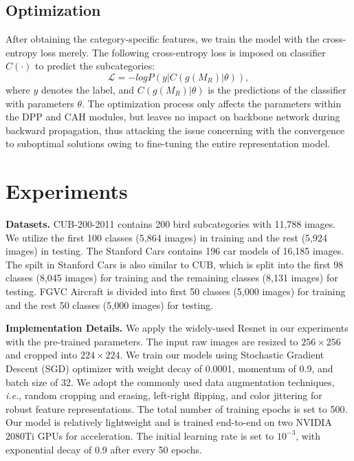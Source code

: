 \documentclass[letterpaper]{article} %
\begin{document}
\subsection{Optimization}

After obtaining the category-specific features, we train the model with the cross-entropy loss merely. The following cross-entropy loss is imposed on classifier $ C(\cdot) $ to predict the subcategories:
\begin{equation}
\mathcal{L} = - log P(y|C(g(M_R)|\theta)),
\end{equation} 
where $ y $ denotes the label, and $ C(g(M_R)|\theta) $ is the predictions of the classifier with parameters $ \theta $. The optimization process only affects the parameters within the DPP and CAH modules, but leaves no impact on backbone network during backward propagation, thus attacking the issue concerning with the convergence to suboptimal solutions owing to fine-tuning the entire representation model.



\section{Experiments}
\noindent\textbf{Datasets.} CUB-200-2011 \cite{Branson2014Bird} contains 200 bird subcategories with 11,788 images. We utilize the first 100 classes (5,864 images) in training and the rest (5,924 images) in testing. The Stanford Cars \cite{Krause20133D} contains 196 car models of 16,185 images. The spilt in Stanford Cars \cite{Krause20133D} is also similar to CUB, which is split into the first 98 classes (8,045 images) for training and the remaining classes (8,131 images) for testing. FGVC Aircraft \cite{DBLP:journals/corr/MajiRKBV13} is divided into first 50 classes (5,000 images) for training and the rest 50 classes (5,000 images) for testing. 



\textbf{Implementation Details.}
We apply the widely-used Resnet \cite{He2015Deep} in our experiments with the pre-trained parameters. The input raw images are resized to $ 256 \times 256 $ and cropped into $ 224 \times 224 $. We train our models using Stochastic Gradient Descent (SGD) optimizer with weight decay of 0.0001, momentum of 0.9, and batch size of 32. 
We adopt the commonly used data augmentation techniques, \textit{i.e.}, random cropping and erasing, left-right flipping, and color jittering for robust feature representations. The total number of training epochs is set to 500. Our model is relatively lightweight and is trained end-to-end on two NVIDIA 2080Ti GPUs for acceleration.
The initial learning rate is set to $ 10^{-3} $, with exponential decay of 0.9 after every 50 epochs. 
\end{document}
